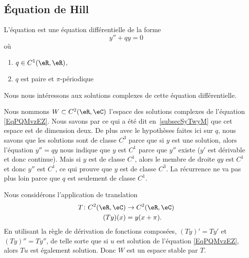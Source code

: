 \subsection{Équation de Hill}
\label{SubSecDWwVVPa}

L'équation  est une équation différentielle de la forme
\begin{equation}    \label{EqPQMvzEZ}
    y''+qy=0
\end{equation}
où
\begin{enumerate}
    \item
        \( q\in C^1(\eR,\eR)\),
    \item
        \( q\) est paire et \( \pi\)-périodique
\end{enumerate}
Nous nous intéressons aux solutions complexes de cette équation différentielle.

Nous nommons \( W\subset C^2(\eR,\eC)\) l'espace des solutions complexes de l'équation \eqref{EqPQMvzEZ}. Nous savons par ce qui a été dit en~\ref{subsecSyTwyM} que cet espace est de dimension deux. De plus avec le hypothèses faites ici sur \( q\), nous savons que les solutions sont de classe $C^3$ parce que si \( y\) est une solution, alors l'équation \( y''=qy\) nous indique que \( y\) est \( C^1\) parce que \( y''\) existe (\( y'\) est dérivable et donc continue). Mais si \( y\) est de classe \( C^1\), alors le membre de droite \( qy\) est \( C^1\) et donc \( y''\) est \( C^1\), ce qui prouve que \( y\) est de classe \( C^3\). La récurrence ne va pas plus loin parce que \( q\) est seulement de classe \( C^1\).

Nous considérons l'application de translation
\begin{equation}
    \begin{aligned}
        T\colon C^2(\eR,\eC)&\to C^2(\eR,\eC) \\
        (Ty)(x)&=y(x+\pi).
    \end{aligned}
\end{equation}
En utilisant la règle de dérivation de fonctions composées, \( (Ty)'=Ty'\) et \( (Ty)''=Ty''\), de telle sorte que si \( u\) est solution de l'équation \eqref{EqPQMvzEZ}, alors \( Tu\) est également solution. Donc \( W\) est un espace stable par \( T\).

